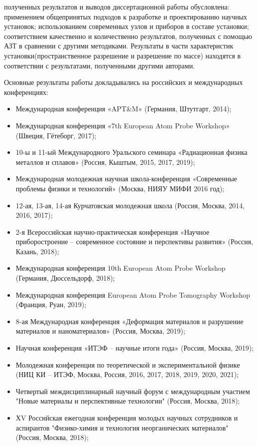 {\reliability} полученных результатов и выводов диссертационной работы обусловлена: применением общепринятых подходов к разработке и проектированию научных установок; использованием современных узлов и приборов в составе установки; соответствием качественно и количественно результатов, полученных с помощью АЗТ в сравнении с другими методиками. Результаты в части характеристик установки(пространственное разрешение и разрешение по массе) находятся в соответствии с результатами, полученными другими авторами.


{\probation}
Основные результаты работы докладывались на российских и международных конференциях:
\begin{itemize}
	\item Международная конференция «APT$\&$M» (Германия, Штутгарт, 2014);
	\item Международная конференция «7th European Atom Probe Workshop» (Швеция, Гётеборг, 2017);
	\item 10-ы и 11-ый Международного Уральского семинара «Радиационная физика металлов и сплавов» (Россия, Кыштым, 2015, 2017, 2019);
	\item Международная молодежная научная школа-конференция «Современные проблемы физики и технологий» (Москва, НИЯУ МИФИ 2016 год);
	\item 12-ая, 13-ая, 14-ая Курчатовская молодежная школа (Россия, Москва, 2014, 2016, 2017);
	\item 2-я Всероссийская научно-практическая конференция «Научное приборостроение – современное состояние и перспективы развития» (Россия, Казань, 2018);
	\item Международная конференция 10th European Atom Probe Workshop (Германия, Дюссельдорф, 2018);
	\item Международная конференция European Atom Probe Tomography Workshop (Франция, Руан, 2019);
	\item 8-ая Международная конференция «Деформация материалов и разрушение материалов и наноматериалов» (Россия, Москва, 2019); 
	\item Научная конференция «ИТЭФ – научные итоги года» (Россия, Москва, 2019);
	\item Молодежная конференция по теоретической и экспериментальной физике (НИЦ КИ – ИТЭФ, Москва, Россия, 2016, 2017, 2018, 2019, 2020, 2021);
	\item Четвертый междисциплинарный научный форум с международным участием "Новые материалы и перспективные технологии" (Россия, Москва, 2018);
	\item ХV Российская ежегодная конференция молодых научных сотрудников и аспирантов "Физико-химия и технология неорганических материалов" (Россия, Москва, 2018);
	
\end{itemize}

